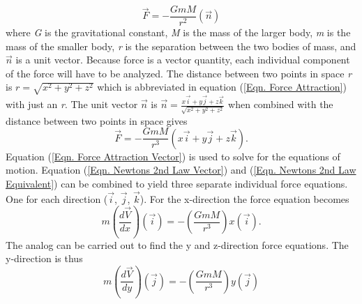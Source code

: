 \documentclass[twocolumn]{article}
\begin{document}
\begin{equation}\label{Eqn. Force Attraction}
\Vec{F}=-\frac{GmM}{r^2} (\Vec{n})
\end{equation}
where \textit{G} is the gravitational constant, \textit{M} is the mass of the larger body, \textit{m} is the mass of the smaller body, \textit{r} is the separation between the two bodies of mass, and $\Vec{n}$ is a unit vector. Because force is a vector quantity, each individual component of the force will have to be analyzed. The distance between two points in space \textit{r} is $\textit{r}=\sqrt{x^2+y^2+z^2}$ which is abbreviated in equation (\ref{Eqn. Force Attraction}) with just an \textit{r}. The unit vector $\Vec{n}$ is  $\Vec{n}=\frac{x\Vec{i}+y\Vec{j}+z\Vec{k}}{\sqrt{x^2+y^2+z^2}}$ when combined with the distance between two points in space gives
\begin{equation}\label{Eqn. Force Attraction Vector}
\Vec{F}=-\frac{GmM}{r^3}(x\Vec{i}+y\Vec{j}+z\Vec{k}).
\end{equation}
Equation (\ref{Eqn. Force Attraction Vector}) is used to solve for the equations of motion. Equation (\ref{Eqn. Newtons 2nd Law Vector}) and (\ref{Eqn. Newtons 2nd Law Equivalent}) can be combined to yield three separate individual force equations. One for each direction ($\Vec{i}$, $\Vec{j}$, $\Vec{k}$). For the x-direction the force equation becomes
\begin{equation}\label{1D Force Equation X}
m(\frac{d\Vec{V}}{dx})(\Vec{i})=-(\frac{GmM}{r^3})x(\Vec{i}).
\end{equation}
The analog can be carried out to find the y and z-direction force equations. The y-direction is thus
\begin{equation}\label{1D Force Equation Y}
m(\frac{d\Vec{V}}{dy})(\Vec{j})=-(\frac{GmM}{r^3})y(\Vec{j})
\end{equation}
\end{document}
